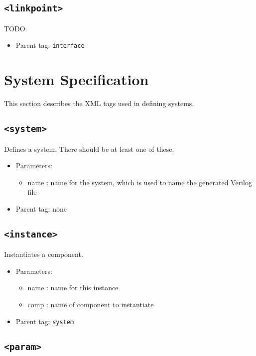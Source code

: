 \documentclass{article}
\begin{document}
\subsection{\texttt{<linkpoint>}}

TODO.

\begin{itemize}
\item{Parent tag: \texttt{interface}}
\end{itemize}

\section{System Specification}

This section describes the XML tags used in defining systems.

\subsection{\texttt{<system>}}

Defines a system. There should be at least one of these.

\begin{itemize}
\item{Parameters:}
\begin{itemize}
\item{name : name for the system, which is used to name the generated Verilog file}
\end{itemize}
\item{Parent tag: none}
\end{itemize}

\subsection{\texttt{<instance>}}

Instantiates a component.

\begin{itemize}
\item{Parameters:}
\begin{itemize}
\item{name : name for this instance}
\item{comp : name of component to instantiate}
\end{itemize}
\item{Parent tag: \texttt{system}}
\end{itemize}

\subsection{\texttt{<param>}}
\end{document}
